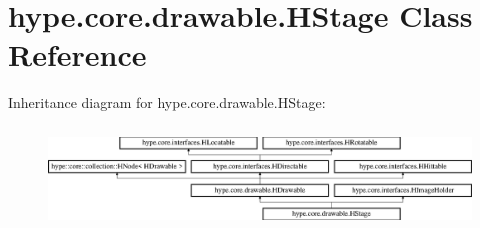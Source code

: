 \hypertarget{classhype_1_1core_1_1drawable_1_1_h_stage}{\section{hype.\-core.\-drawable.\-H\-Stage Class Reference}
\label{classhype_1_1core_1_1drawable_1_1_h_stage}
}
Inheritance diagram for hype.\-core.\-drawable.\-H\-Stage\-:\begin{figure}[H]
\begin{center}
\leavevmode
\includegraphics[height=2.745098cm]{classhype_1_1core_1_1drawable_1_1_h_stage}
\end{center}
\end{figure}

